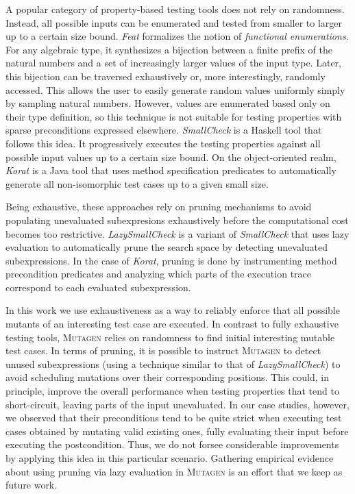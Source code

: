 \documentclass[sigconf, anonymous, review]{acmart}
\newcommand{\mutagen}{\textsc{Mutagen}\xspace}
\begin{document}
A popular category of property-based testing tools does not rely on randomness.
%
Instead, all possible inputs can be enumerated and tested from smaller to larger
up to a certain size bound.
%
%
%
\emph{Feat} \cite{DuregardJW12} formalizes the notion of \emph{functional
  enumerations}.
%
For any algebraic type, it synthesizes a bijection between a finite prefix of
the natural numbers and a set of increasingly larger values of the input type.
%
Later, this bijection can be traversed exhaustively or, more interestingly,
randomly accessed.
%
This allows the user to easily generate random values uniformly simply by
sampling natural numbers.
%
However, values are enumerated based only on their type definition, so this
technique is not suitable for testing properties with sparse preconditions
expressed elsewhere.
%
\emph{SmallCheck} \cite{runciman2008smallcheck} is a Haskell tool that follows
this idea.
%
It progressively executes the testing properties against all possible input
values up to a certain size bound.
%
On the object-oriented realm, \emph{Korat} \cite{boyapati2002korat} is a Java
tool that uses method specification predicates to automatically generate all
non-isomorphic test cases up to a given small size.


Being exhaustive, these approaches rely on pruning mechanisms to avoid
populating unevaluated subexpresions exhaustively before the computational cost
becomes too restrictive.
%
\emph{LazySmallCheck} is a variant of \emph{SmallCheck} that uses lazy
evaluation to automatically prune the search space by detecting unevaluated
subexpressions.
%
In the case of \emph{Korat}, pruning is done by instrumenting method
precondition predicates and analyzing which parts of the execution trace
correspond to each evaluated subexpression.


In this work we use exhaustiveness as a way to reliably enforce that all
possible mutants of an interesting test case are executed.
%
In contrast to fully exhaustive testing tools, \mutagen relies on randomness to
find initial interesting mutable test cases.
%
In terms of pruning, it is possible to instruct \mutagen to detect unused
subexpressions (using a technique similar to that of \emph{LazySmallCheck}) to
avoid scheduling mutations over their corresponding positions.
%
This could, in principle, improve the overall performance when testing
properties that tend to short-circuit, leaving parts of the input unevaluated.
%
In our case studies, however, we observed that their preconditions tend to be
quite strict when executing test cases obtained by mutating valid existing ones,
fully evaluating their input before executing the postcondition.
%
Thus, we do not forsee considerable improvements by applying this idea in this
particular scenario.
%
Gathering empirical evidence about using pruning via lazy evaluation in \mutagen
is an effort that we keep as future work.
\end{document}
